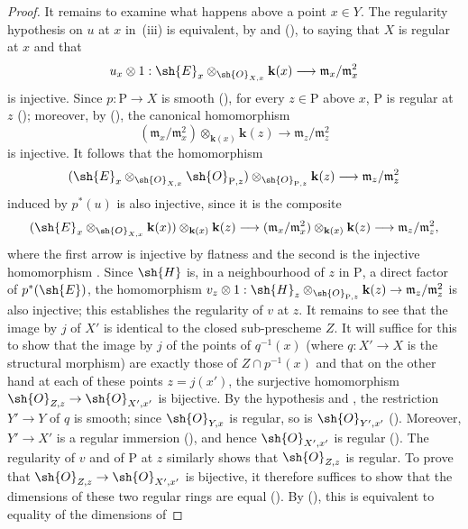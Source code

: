 \begin{proof}
It remains to examine what happens above a point $x\in Y$.
The regularity hypothesis on $u$ at $x$ in~(iii) is equivalent, by  and (), to saying that $X$ is regular at $x$ and that
\[
  u_x\otimes1:\sh{E}_x\otimes_{\sh{O}_{X,x}}\mathbf{k}(x)\longrightarrow\mathfrak{m}_x/\mathfrak{m}_x^2
\]
is injective.
Since $p:\mathrm{P}\to X$ is smooth (), for every $z\in\mathrm{P}$ above $x$, $\mathrm{P}$ is regular at $z$ (); moreover, by (), the canonical homomorphism
\[
  (\mathfrak{m}_x/\mathfrak{m}_x^2)\otimes_{\mathbf{k}(x)}\mathbf{k}(z)\longrightarrow\mathfrak{m}_z/\mathfrak{m}_z^2
  \tag{19.4.11.1}\label{IV.19.4.11.1}
\]
is injective.
It follows that the homomorphism
\[
  (\sh{E}_x\otimes_{\sh{O}_{X,x}}\sh{O}_{\mathrm{P},z})\otimes_{\sh{O}_{\mathrm{P},z}}\mathbf{k}(z)
  \longrightarrow\mathfrak{m}_z/\mathfrak{m}_z^2
\]
induced by $p^*(u)$ is also injective, since it is the composite
\[
  (\sh{E}_x\otimes_{\sh{O}_{X,x}}\mathbf{k}(x))\otimes_{\mathbf{k}(x)}\mathbf{k}(z)
  \longrightarrow(\mathfrak{m}_x/\mathfrak{m}_x^2)\otimes_{\mathbf{k}(x)}\mathbf{k}(z)
  \longrightarrow\mathfrak{m}_z/\mathfrak{m}_z^2,
\]
where the first arrow is injective by flatness and the second is the injective homomorphism .
Since $\sh{H}$ is, in a neighbourhood of $z$ in $\mathrm{P}$, a direct factor of $p^*(\sh{E})$, the homomorphism
$v_z\otimes1:\sh{H}_z\otimes_{\sh{O}_{\mathrm{P},z}}\mathbf{k}(z)\to\mathfrak{m}_z/\mathfrak{m}_z^2$ is also injective; this establishes the regularity of $v$ at $z$.
It remains to see that the image by $j$ of $X'$ is identical to the closed sub-prescheme $Z$.
It will suffice for this to show that the image by $j$ of the points of $q^{-1}(x)$ (where $q:X'\to X$ is the structural morphism) are exactly those of $Z\cap p^{-1}(x)$ and that on the other hand at each of these points $z=j(x')$, the surjective homomorphism $\sh{O}_{Z,z}\to\sh{O}_{X',x'}$ is bijective.
By the hypothesis and , the restriction $Y'\to Y$ of $q$ is smooth; since $\sh{O}_{Y,x}$ is regular, so is $\sh{O}_{Y',x'}$ (). Moreover, $Y'\to X'$ is a regular immersion (), and hence $\sh{O}_{X',x'}$ is regular (). The regularity of $v$ and of $\mathrm{P}$ at $z$ similarly shows that $\sh{O}_{Z,z}$ is regular.
To prove that $\sh{O}_{Z,z}\to\sh{O}_{X',x'}$ is bijective, it therefore suffices to show that the dimensions
of these two regular rings are equal ().
By (), this is equivalent to equality of the dimensions of

\end{proof}
